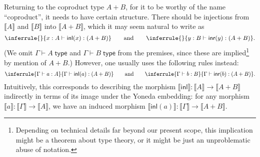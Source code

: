 \documentclass[12pt]{article}
\def\ty{\;\mathsf{type}}
\def\m#1{\llbracket#1\rrbracket}
\def\inl{\mathsf{inl}}
\def\inr{\mathsf{inr}}
\def\types{\vdash}
\numberwithin{equation}{section}
\begin{document}
Returning to the coproduct type $A+B$, for it to be worthy of the name ``coproduct'', it needs to have certain structure.
There should be injections from $\m A$ and $\m B$ into $\m {A+B}$, which %
it may seem natural to write as
\begin{equation}
  \inferrule{ }{x:A\types \inl(x) :(A+B)}
  \qquad \text{and}\qquad
  \inferrule{ }{y:B\types \inr(y) :(A+B)}.\label{eq:inl-nocut}
\end{equation}
(We omit $\Gamma \types A\ty$ and $\Gamma\types B\ty$ from the premises, since these are implied\footnote{Depending on technical details far beyond our present scope, this implication might be a theorem about type theory, or it might be just an unproblematic abuse of notation.} by mention of $A+B$.)
However, one usually uses the following rules instead:
\begin{equation}
  \inferrule{\Gamma \types a:A}{\Gamma\types \inl(a) :(A+B)}
  \qquad \text{and}\qquad
  \inferrule{\Gamma \types b:B}{\Gamma\types \inr(b) :(A+B)}.\label{eq:inl-cut}
\end{equation}
Intuitively, this corresponds to describing the morphism $\m\inl:\m A \to \m{A+B}$ indirectly in terms of its image under the Yoneda embedding: for any morphism $\m a :\m\Gamma \to \m A$, we have an induced morphism $\m {\inl(a)} :\m\Gamma \to \m {A+B}$.
\end{document}
